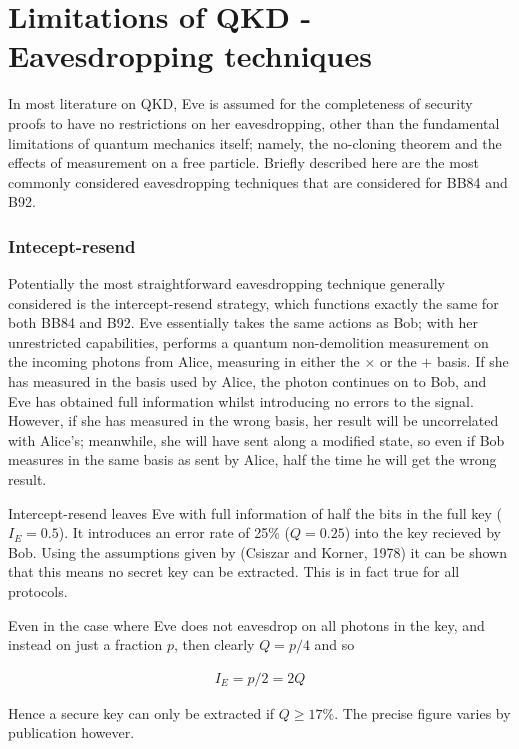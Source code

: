 \documentclass[paper=a4, fontsize=11pt]{scrartcl} %
\numberwithin{equation}{section} %
\numberwithin{figure}{section} %
\numberwithin{table}{section} %
\begin{document}
\section{Limitations of QKD - Eavesdropping techniques}
In most literature on QKD, Eve is assumed for the completeness of security proofs to have no restrictions
on her eavesdropping, other than the fundamental limitations of quantum mechanics itself; namely, the
no-cloning theorem and the effects of measurement on a free particle. Briefly described here are the
most commonly considered eavesdropping techniques that are considered for BB84 and B92.

\subsubsection{Intecept-resend}
Potentially the most straightforward eavesdropping technique generally considered is the intercept-resend
strategy, which functions exactly the same for both BB84 and  B92.
Eve essentially takes the same actions as Bob; with her unrestricted capabilities, performs
a quantum non-demolition measurement on the incoming photons from Alice, measuring in either the $\times$
or the $+$ basis. If she has measured in the basis used by Alice, the photon continues on to Bob,
and Eve has obtained full information whilst introducing no errors to the signal. However, if she has measured
in the wrong basis, her result will be uncorrelated with Alice's; meanwhile, she will have sent along
a modified state, so even if Bob measures in the same basis as sent by Alice, half the time he will get the
wrong result. %

Intercept-resend leaves Eve with full information of half the bits in the full key ($I_E = 0.5$). It introduces
an error rate of 25\% ($Q = 0.25$) into the key recieved by Bob. Using the assumptions given by (Csiszar and Korner, 1978) %
it can be shown that this means no secret key can be extracted. This is in fact true for all protocols.

Even in the case where Eve does not eavesdrop on all photons in the key, and instead on just a fraction $p$,
then clearly $Q = p/4$ and so

\begin{align}
I_E	= p/2 = 2Q
\end{align}

Hence a secure key can only be extracted if $Q \geq 17\%$. The precise figure varies by%
publication however. %
\end{document}
